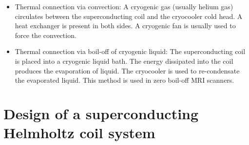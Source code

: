 \documentclass{ws-jmrr}
\begin{document}
\begin{multicols}{2}
\begin{itemize}[leftmargin=*]
\item Thermal connection via convection: A cryogenic gas (usually helium gas) circulates between the superconducting coil and the cryocooler cold head. A heat exchanger is present in both sides. A cryogenic fan is usually used to force the convection.
\item  Thermal connection via boil-off of cryogenic liquid: The superconducting coil is placed into a cryogenic liquid bath. The energy dissipated into the coil produces the evaporation of liquid. The cryocooler is used to re-condensate the evaporated liquid. This method is used in zero boil-off MRI scanners.
\end{itemize}

\section{Design of a superconducting Helmholtz coil system}

\end{multicols}
\end{document}
